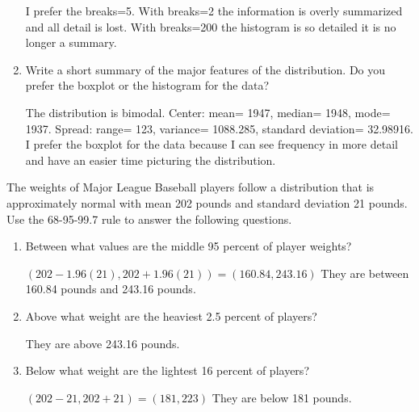 \documentclass[12pt]{article}
\newenvironment{question}[2][Question]{\begin{trivlist}
\item[\hskip \labelsep {\bfseries #1}\hskip \labelsep {\bfseries #2.}]}{\end{trivlist}}
\begin{document}
\begin{enumerate}[label=(\alph*)]
I prefer the breaks=5. With breaks=2 the information is overly summarized and all detail is lost. With breaks=200 the histogram is so detailed it is no longer a summary. 

\item Write a short summary of the major features of the distribution. Do you prefer the boxplot or the histogram for the data?

The distribution is bimodal. Center: mean= 1947, median= 1948, mode= 1937. Spread: range= 123, variance= 1088.285, standard deviation= 32.98916. I prefer the boxplot for the data because I can see frequency in more detail and have an easier time picturing the distribution. 
\end{enumerate}

\begin{question}{4}
The weights of Major League Baseball players follow a distribution that is approximately normal with mean 202 pounds and standard deviation 21 pounds. Use the 68-95-99.7 rule to answer the following questions.
\end{question}
\begin{enumerate}[label=(\alph*)]
\item Between what values are the middle 95 percent of player weights?

$(202-1.96(21), 202+1.96(21))=(160.84, 243.16)$
They are between 160.84 pounds and 243.16 pounds. 
\item Above what weight are the heaviest 2.5 percent of players?

They are above 243.16 pounds.
\item Below what weight are the lightest 16 percent of players?

$(202-21,202+21)=(181,223)$
They are below 181 pounds.
\end{enumerate}

 
 
\end{document}
